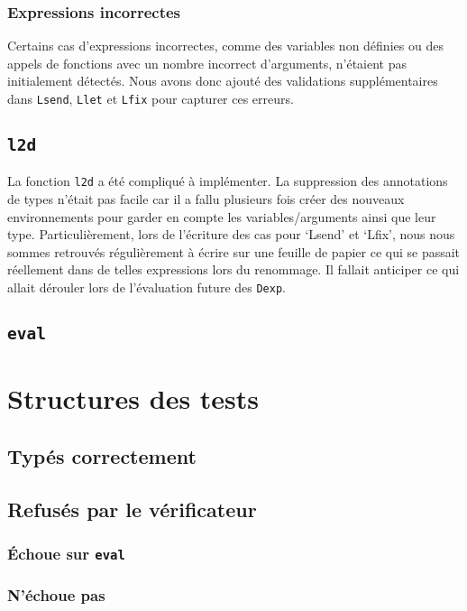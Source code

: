 \documentclass[a4paper,12pt]{article}
\begin{document}
    \subsubsection{Expressions incorrectes}
    Certains cas d’expressions incorrectes, comme des variables non définies ou des appels de fonctions avec un nombre incorrect d’arguments, n’étaient pas initialement détectés. Nous avons donc ajouté des validations supplémentaires dans \texttt{Lsend}, \texttt{Llet} et \texttt{Lfix} pour capturer ces erreurs.


    \subsection{\texttt{l2d}}
        La fonction \texttt{l2d} a été compliqué à implémenter. La suppression des annotations
        de types n'était pas facile car il a fallu plusieurs fois créer des nouveaux environnements
        pour garder en compte les variables/arguments ainsi que leur type. Particulièrement, lors
        de l'écriture des cas pour `Lsend' et `Lfix', nous nous sommes retrouvés régulièrement à
        écrire sur une feuille de papier ce qui se passait réellement dans de telles expressions
        lors du renommage. Il fallait anticiper ce qui allait dérouler lors de l'évaluation future
        des \texttt{Dexp}.
    \subsection{\texttt{eval}}

\newpage
\section{Structures des tests}
    \subsection{Typés correctement}
    \subsection{Refusés par le vérificateur}
        \subsubsection{Échoue sur \texttt{eval}}
        \subsubsection{N'échoue pas}
\end{document}
